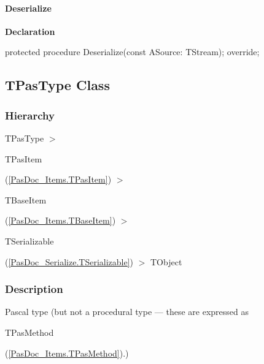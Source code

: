 \documentclass{report}
\newif\ifpdf
\begin{document}
\paragraph*{Deserialize}\hspace*{\fill}

\label{PasDoc_Items.TPasFieldVariable-Deserialize}
\begin{list}{}{
\setlength{\itemindent}{0cm}
\setlength{\listparindent}{0cm}
\setlength{\leftmargin}{\evensidemargin}
\addtolength{\leftmargin}{\tmplength}
\settowidth{\labelsep}{X}
\addtolength{\leftmargin}{\labelsep}
\setlength{\labelwidth}{\tmplength}
}
\item[\textbf{Declaration}\hfill]
\ifpdf
\begin{flushleft}
\fi
\begin{ttfamily}
protected procedure Deserialize(const ASource: TStream); override;\end{ttfamily}

\ifpdf
\end{flushleft}
\fi

\end{list}
\ifpdf
\subsection*{\large{\textbf{TPasType Class}}\normalsize\hspace{1ex}\hrulefill}
\else
\subsection*{TPasType Class}
\fi
\label{PasDoc_Items.TPasType}
\subsubsection*{\large{\textbf{Hierarchy}}\normalsize\hspace{1ex}\hfill}
TPasType {$>$} \begin{ttfamily}TPasItem\end{ttfamily}(\ref{PasDoc_Items.TPasItem}) {$>$} \begin{ttfamily}TBaseItem\end{ttfamily}(\ref{PasDoc_Items.TBaseItem}) {$>$} \begin{ttfamily}TSerializable\end{ttfamily}(\ref{PasDoc_Serialize.TSerializable}) {$>$} 
TObject
\subsubsection*{\large{\textbf{Description}}\normalsize\hspace{1ex}\hfill}
Pascal type (but not a procedural type --- these are expressed as \begin{ttfamily}TPasMethod\end{ttfamily}(\ref{PasDoc_Items.TPasMethod}).)\ifpdf
\end{document}
